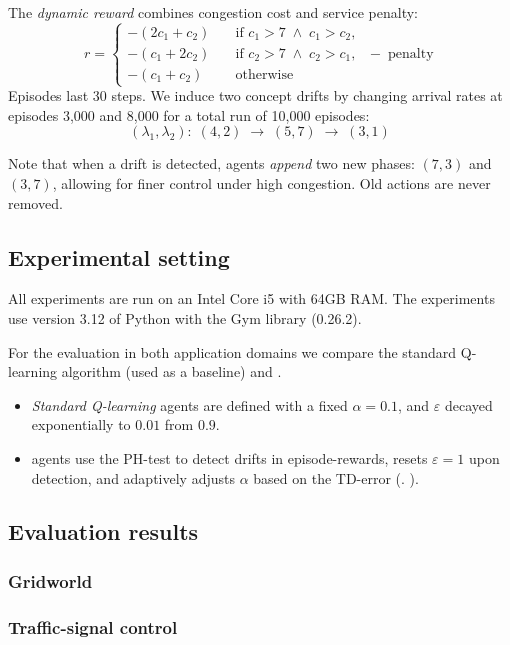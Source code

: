 The \emph{dynamic reward} combines congestion cost and service penalty:
\[
r = 
\begin{cases}
-(2c_1 + c_2)\quad &\text{if }c_1>7 \;\wedge\;c_1>c_2,\\
-(c_1 + 2c_2)\quad &\text{if }c_2>7 \;\wedge\;c_2>c_1,\\
-(c_1 + c_2)\quad &\text{otherwise}
\end{cases}
\;-\;\mathrm{penalty}\,
\]
Episodes last 30 steps. We induce two concept drifts by changing arrival rates at episodes 3,000 and 8,000 for a total run of 10,000 episodes:
\[
(\lambda_1,\lambda_2):
\;(4,2)\;\to\;(5,7)\;\to\;(3,1)
\]

Note that when a drift is detected, agents \emph{append} two new phases:
$(7,3)$ and $(3,7)$, allowing for finer control under high congestion. Old actions are never removed.

\subsection{Experimental setting}
All experiments are run on an Intel Core i5 with 64GB RAM. The experiments use version 3.12 of Python with the Gym library (0.26.2). 

For the evaluation in both application domains we compare the standard Q-learning algorithm (used as a baseline) and \adaptiverl.
\begin{itemize}
  \item \emph{Standard Q-learning} agents are defined with a fixed $\alpha=0.1$, and $\varepsilon$ decayed exponentially to $0.01$ from $0.9$.
  \item \adaptiverl agents use the PH-test to detect drifts in episode-rewards, resets $\varepsilon\!=\!1$ upon detection, and adaptively adjusts $\alpha$ based on the TD-error (\cf. ).  
\end{itemize}

\subsection{Evaluation results}

\subsubsection{Gridworld}


\subsubsection{Traffic-signal control}

